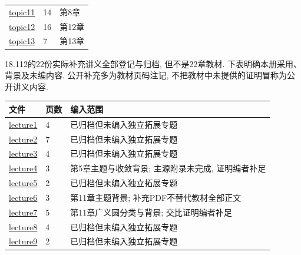 \begin{longtable}{p{}p{}p{}}
\href{https://ocw.mit.edu/courses/18-04-complex-variables-with-applications-spring-2018/resources/mit18_04s18_topic11/}{topic11} & 14 & 第8章\\
\href{https://ocw.mit.edu/courses/18-04-complex-variables-with-applications-spring-2018/resources/mit18_04s18_topic12/}{topic12} & 16 & 第12章\\
\href{https://ocw.mit.edu/courses/18-04-complex-variables-with-applications-spring-2018/resources/mit18_04s18_topic13/}{topic13} & 7 & 第13章\\
\bottomrule\end{longtable}
18.112的22份实际补充讲义全部登记与归档, 但不是22章教材. 下表明确本册采用、背景及未编内容. 公开补充多为教材页码注记, 不把教材中未提供的证明冒称为公开讲义内容.
\begin{longtable}{p{}p{}p{}}
\toprule 文件 & 页数 & 编入范围\\\midrule\endhead
\href{https://ocw.mit.edu/courses/18-112-functions-of-a-complex-variable-fall-2008/resources/lecture1/}{lecture1} & 4 & 已归档但未编入独立拓展专题\\
\href{https://ocw.mit.edu/courses/18-112-functions-of-a-complex-variable-fall-2008/resources/lecture2/}{lecture2} & 7 & 已归档但未编入独立拓展专题\\
\href{https://ocw.mit.edu/courses/18-112-functions-of-a-complex-variable-fall-2008/resources/lecture3/}{lecture3} & 4 & 已归档但未编入独立拓展专题\\
\href{https://ocw.mit.edu/courses/18-112-functions-of-a-complex-variable-fall-2008/resources/lecture4/}{lecture4} & 3 & 第5章主题与收敛背景; 主源附录未完成, 证明编者补足\\
\href{https://ocw.mit.edu/courses/18-112-functions-of-a-complex-variable-fall-2008/resources/lecture5/}{lecture5} & 2 & 已归档但未编入独立拓展专题\\
\href{https://ocw.mit.edu/courses/18-112-functions-of-a-complex-variable-fall-2008/resources/lecture6/}{lecture6} & 3 & 第11章主题背景; 补充PDF不替代教材全部正文\\
\href{https://ocw.mit.edu/courses/18-112-functions-of-a-complex-variable-fall-2008/resources/lecture7/}{lecture7} & 5 & 第11章广义圆分类与背景; 交比证明编者补足\\
\href{https://ocw.mit.edu/courses/18-112-functions-of-a-complex-variable-fall-2008/resources/lecture8/}{lecture8} & 4 & 已归档但未编入独立拓展专题\\
\href{https://ocw.mit.edu/courses/18-112-functions-of-a-complex-variable-fall-2008/resources/lecture9/}{lecture9} & 2 & 已归档但未编入独立拓展专题\\

\end{longtable}
